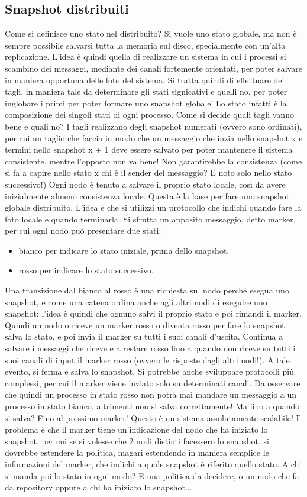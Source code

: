 \subsection{Snapshot distribuiti}
Come si definisce uno stato nel distribuito? Si vuole uno stato globale, ma non è sempre possibile salvarsi tutta la
memoria sul disco, specialmente con un'alta replicazione. L'idea è quindi quella di realizzare un sistema in cui i
processi si scambino dei messaggi, mediante dei canali fortemente orientati, per poter salvare in maniera opportuna
delle foto del sistema. Si tratta quindi di effettuare dei tagli, in maniera tale da determinare gli stati signicativi 
e quelli no, per poter inglobare i primi per poter formare uno snapshot globale! Lo stato infatti è la composizione 
dei singoli stati di ogni processo.
Come si decide quali tagli vanno bene e quali no? I tagli realizzano degli snapshot numerati (ovvero sono ordinati), 
per cui un taglio che faccia in modo che un messaggio che inzia nello snapshot x e termini nello snapshot x + 1 deve
essere salvato per poter mantenere il sistema consistente, mentre l'opposto non va bene! Non garantirebbe la 
consistenza (come si fa a capire nello stato x chi è il sender del messaggio? E noto solo nello stato successivo!)
Ogni nodo è tenuto a salvare il proprio stato locale, così da avere inizialmente almeno consistenza locale. Questa è 
la base per fare uno snapshot globale distribuito. L'idea è che si utilizzi un protocollo che indichi quando fare la
foto locale e quando terminarla. Si sfrutta un apposito messaggio, detto marker, per cui ogni nodo può presentare due
stati:
\begin{itemize}
 \item bianco per indicare lo stato iniziale, prima dello snapshot.
 \item rosso per indicare lo stato successivo.
\end{itemize}
Una transizione dal bianco al rosso è una richiesta sul nodo perché esegua uno snapshot, e come una catena ordina 
anche agli altri nodi di eseguire uno snapshot: l'idea è quindi che ognuno salvi il proprio stato e poi rimandi il
marker. Quindi un nodo o riceve un marker rosso o diventa rosso per fare lo snapshot: salva lo stato, e poi invia il
marker su tutti i suoi canali d'uscita. Continua a salvare i messaggi che riceve e a restare rosso fino a quando
non riceve su tutti i suoi canali di input il marker rosso (ovvero le risposte dagli altri nodi!). A tale evento, si
ferma e salva lo snapshot. Si potrebbe anche sviluppare protocolli più complessi, per cui il marker viene inviato solo
su determinati canali. Da osservare che quindi un processo in stato rosso non potrà mai mandare un messaggio a un
processo in stato bianco, altrimenti non si salva correttamente!
Ma fino a quando si salva? Fino al prossimo marker! Questo è un sistema assolutamente scalabile! Il problema è che il
marker tiene un'indicazione del nodo che ha iniziato lo snapshot, per cui se si volesse che 2 nodi distinti facessero
lo snapshot, si dovrebbe estendere la politica, magari estendendo in maniera semplice le informazioni del marker, che
indichi a quale snapshot è riferito quello stato. A chi si manda poi lo stato in ogni modo? E una politica da decidere,
o un nodo che fa da repository oppure a chi ha iniziato lo snapshot...